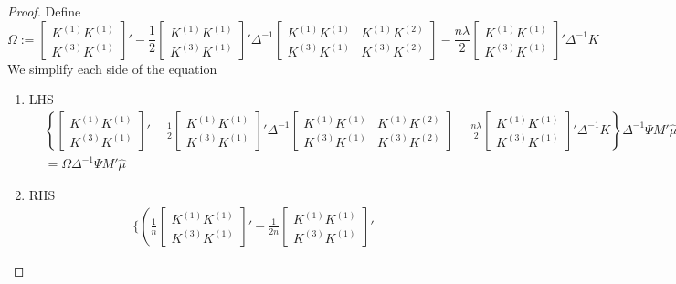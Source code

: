 \begin{proof}
Define
$$
\Omega:=\begin{bmatrix}K^{(1)}K^{(1)} \\ K^{(3)}K^{(1)} \end{bmatrix}'
%
-\frac{1}{2}\begin{bmatrix}K^{(1)}K^{(1)} \\ K^{(3)}K^{(1)} \end{bmatrix}'    
\Delta^{-1}
       \begin{bmatrix} K^{(1)}K^{(1)} & K^{(1)} K^{(2)} \\ K^{(3)} K^{(1)} & K^{(3)}K^{(2)}\end{bmatrix}
        -\frac{n\lambda}{2}\begin{bmatrix}K^{(1)}K^{(1)} \\ K^{(3)}K^{(1)} \end{bmatrix}' \Delta^{-1}K 
$$
We simplify each side of the equation
\begin{enumerate}
    \item LHS
 \begin{align}
&\left\{
\begin{bmatrix}K^{(1)}K^{(1)} \\ K^{(3)}K^{(1)} \end{bmatrix}'
%
-\frac{1}{2}\begin{bmatrix}K^{(1)}K^{(1)} \\ K^{(3)}K^{(1)} \end{bmatrix}'    
\Delta^{-1}
       \begin{bmatrix} K^{(1)}K^{(1)} & K^{(1)} K^{(2)} \\ K^{(3)} K^{(1)} & K^{(3)}K^{(2)}\end{bmatrix}
        -\frac{n\lambda}{2}\begin{bmatrix}K^{(1)}K^{(1)} \\ K^{(3)}K^{(1)} \end{bmatrix}' \Delta^{-1}K 
        \right\}\Delta^{-1}\Psi M'\hat{\mu}\\
        &=\Omega\Delta^{-1}\Psi M'\hat{\mu}
 \end{align}
    \item RHS 
 \begin{align}
&\bigg\{
       \left(\frac{1}{n} \begin{bmatrix} K^{(1)} K^{(1)} \\ K^{(3)} K^{(1)}\end{bmatrix}'
       -\frac{1}{2n}\begin{bmatrix}K^{(1)}K^{(1)} \\ K^{(3)}K^{(1)} \end{bmatrix}'    

\end{align}
\end{enumerate}
\end{proof}
